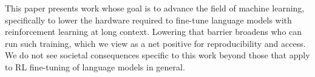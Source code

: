 This paper presents work whose goal is to advance the field of machine
learning, specifically to lower the hardware required to fine-tune language
models with reinforcement learning at long context. Lowering that barrier
broadens who can run such training, which we view as a net positive for
reproducibility and access. We do not see societal consequences specific to
this work beyond those that apply to RL fine-tuning of language models in
general.
